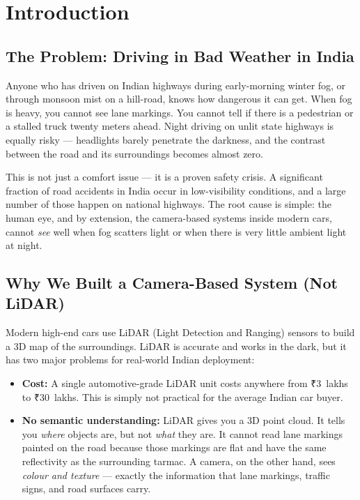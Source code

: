 \documentclass[12pt, a4paper]{article}
\begin{document}
\tableofcontents
\newpage

\section{Introduction}

\subsection{The Problem: Driving in Bad Weather in India}

Anyone who has driven on Indian highways during early-morning winter fog,
or through monsoon mist on a hill-road, knows how dangerous it can get.
When fog is heavy, you cannot see lane markings. You cannot tell if there is
a pedestrian or a stalled truck twenty meters ahead. Night driving on
unlit state highways is equally risky — headlights barely penetrate the
darkness, and the contrast between the road and its surroundings becomes
almost zero.

This is not just a comfort issue — it is a proven safety crisis. A significant
fraction of road accidents in India occur in low-visibility conditions, and a
large number of those happen on national highways. The root cause is simple:
the human eye, and by extension, the camera-based systems inside modern cars,
cannot \textit{see} well when fog scatters light or when there is very little
ambient light at night.

\subsection{Why We Built a Camera-Based System (Not LiDAR)}

Modern high-end cars use LiDAR (Light Detection and Ranging) sensors to build
a 3D map of the surroundings. LiDAR is accurate and works in the dark, but it
has two major problems for real-world Indian deployment:

\begin{itemize}
  \item \textbf{Cost:} A single automotive-grade LiDAR unit costs anywhere from
  ₹3~lakhs to ₹30~lakhs. This is simply not practical for the average Indian car buyer.

  \item \textbf{No semantic understanding:} LiDAR gives you a 3D point cloud.
  It tells you \textit{where} objects are, but not \textit{what} they are. It
  cannot read lane markings painted on the road because those markings are flat
  and have the same reflectivity as the surrounding tarmac. A camera, on the
  other hand, sees \textit{colour and texture} — exactly the information that
  lane markings, traffic signs, and road surfaces carry.
\end{itemize}
\end{document}
